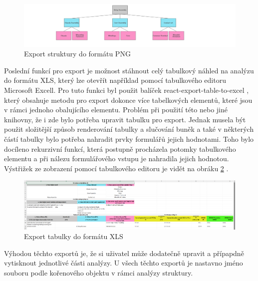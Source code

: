 \begin{figure}[h]
\centering
	\includegraphics[width=1.0\textwidth]{Figures/Relay_Assembly.png}
	\caption{Export struktury do formátu PNG}
	\label{fig:graphPNG}
\end{figure}

Poslední funkcí pro export je možnost stáhnout celý tabulkový náhled na analýzu do formátu XLS, který lze otevřít například pomocí tabulkového editoru Microsoft Excell. Pro tuto funkci byl použit balíček react-export-table-to-excel \cite{exportTable}, který obsahuje metodu pro export dokonce více tabelkových elementů, které jsou v rámci jednoho obalujícího elementu. Problém při použití této nebo jiné knihovny, že i zde bylo potřeba upravit tabulku pro export. Jednak musela být použit složitější způsob renderování tabulky a slučování buněk a také v některých částí tabulky bylo potřeba nahradit prvky formulářů jejich hodnotami. Toho bylo docíleno rekurzivní funkcí, která postupně procházela potomky tabulkového elementu a při nálezu formulářového vstupu je nahradila jejich hodnotou. Výstřižek ze zobrazení pomocí tabulkového editoru je vidět na obráku  \ref{fig:excel} . 

\begin{figure}[h]
\centering
	\includegraphics[width=1.0\textwidth]{Figures/excel.png}
	\caption{Export tabulky do formátu XLS}
	\label{fig:excel}
\end{figure}

Výhodou těchto exportů je, že si uživatel může dodatečně upravit a přípapdně vytisknout jednotlivé části analýzy. U všech těchto exportů je nastavno jméno souboru podle kořenového objektu v rámci analýzy struktury. 

